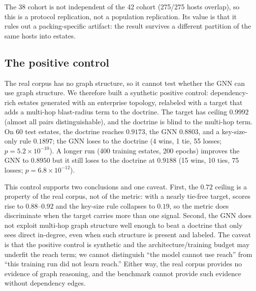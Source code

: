 \documentclass[conference,10pt]{IEEEtran}
\begin{document}
The 38 cohort is not independent of the 42 cohort (275/275 hosts overlap), so this is a protocol
replication, not a population replication. Its value is that it rules out a packing-specific
artifact: the result survives a different partition of the same hosts into estates.

\subsection{The positive control}
The real corpus has no graph structure, so it cannot test whether the GNN can use graph
structure. We therefore built a synthetic positive control: dependency-rich estates generated
with an enterprise topology, relabeled with a target that adds a multi-hop blast-radius term to
the doctrine. The target has ceiling $0.9992$ (almost all pairs distinguishable), and the
doctrine is blind to the multi-hop term. On 60 test estates, the doctrine reaches $0.9173$, the
GNN $0.8803$, and a key-size-only rule $0.1897$; the GNN loses to the doctrine (4 wins, 1 tie,
55 losses; $p=5.2\times10^{-10}$). A longer run (400 training estates, 200 epochs) improves the
GNN to $0.8950$ but it still loses to the doctrine at $0.9188$ (15 wins, 10 ties, 75 losses;
$p=6.8\times10^{-12}$).

This control supports two conclusions and one caveat. First, the $0.72$ ceiling is a property
of the real corpus, not of the metric: with a nearly tie-free target, scores rise to
$0.88$--$0.92$ and the key-size rule collapses to $0.19$, so the metric does discriminate when
the target carries more than one signal. Second, the GNN does not exploit multi-hop graph
structure well enough to beat a doctrine that only sees direct in-degree, even when such
structure is present and labeled. The caveat is that the positive control is synthetic and the
architecture/training budget may underfit the reach term; we cannot distinguish ``the model
cannot use reach'' from ``this training run did not learn reach.'' Either way, the real corpus
provides no evidence of graph reasoning, and the benchmark cannot provide such evidence without
dependency edges.
\end{document}
